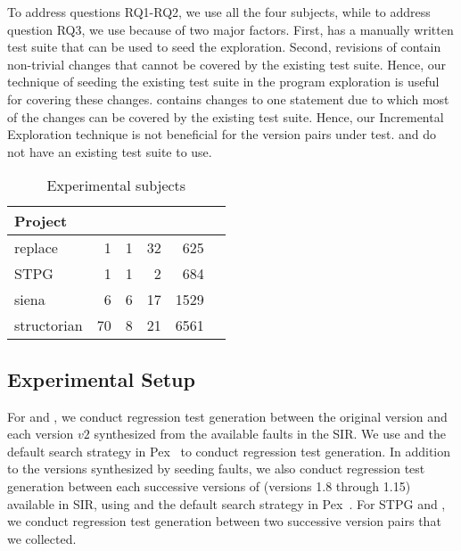To address questions RQ1-RQ2, we use all the four subjects, while to address question RQ3, we use  because of two major factors. First,  has a manually written test suite that can be used to seed the exploration. Second, revisions of  contain non-trivial changes that cannot be covered by the existing test suite. Hence, our technique of seeding the existing test suite in the program exploration is useful for covering these changes.  contains changes to one statement due to which most of the changes can be covered by the existing test suite.
Hence, our Incremental Exploration technique is not beneficial for the version pairs under test.
  and  do not have an existing test suite to use.

\setlength{\tabcolsep}{6pt}
\begin{table}
\begin{CodeOut}
\begin{center}
\caption {\label{table:subjects}Experimental subjects}
\begin {tabular} {|l|r|r|r|r|r|}
\hline
Project&\CenterCell{Classes}&\CenterCell{Classes Covered}&\CenterCell{Versions}&\CenterCell{LOC}\\

\hline
\hline replace &1&1&32&625\\
\hline STPG &1&1&2&684\\
\hline siena &6&6&17&1529\\
\hline structorian &70&8&21&6561\\
\hline
\end{tabular}
\end{center}
\end{CodeOut}
\vspace{- 0.3 in}
\end{table}



\subsection{Experimental Setup}
For  and , we conduct regression test generation between the original version and each version $v2$ synthesized from the available faults in the SIR. We use  and the default search strategy in Pex~\cite{Pex,fitnex} to conduct regression test generation. In addition to the versions synthesized by seeding faults, we also conduct regression test generation between each successive versions of  (versions 1.8 through 1.15) available in SIR, using  and the default search strategy in Pex~\cite{Pex,fitnex}. For STPG and , we conduct regression test generation between two successive version pairs that we collected. 

